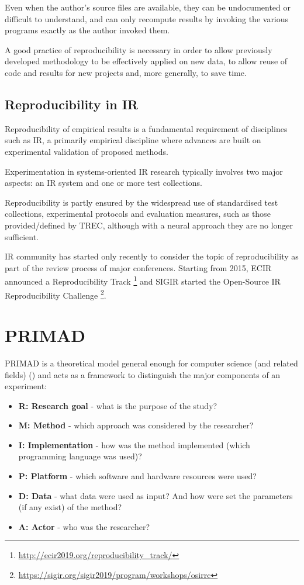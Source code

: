 Even when the author's source files are available, they can be undocumented or difficult to understand, and can only recompute results by invoking the various programs exactly as the author invoked them.

A good practice of reproducibility is necessary in order to allow previously developed methodology to be effectively applied on new data, to allow reuse of code and results for new projects and, more generally, to save time.

\subsection{Reproducibility in IR}

Reproducibility of empirical results is a fundamental requirement of disciplines such as IR, a primarily empirical discipline where advances are built on experimental validation of proposed methods.

Experimentation in systems-oriented IR research typically involves two major aspects: an IR system and one or more test collections.

Reproducibility is partly ensured by the widespread use of standardised test collections, experimental protocols and evaluation measures, such as those provided/defined by TREC, although with a neural approach they are no longer sufficient.

IR community has started only recently to consider the topic of reproducibility as part of the review process of major conferences. Starting from 2015, ECIR announced a Reproducibility Track \footnote{\url{http://ecir2019.org/reproducibility_track/}} and SIGIR started the Open-Source IR Reproducibility Challenge \footnote{\url{https://sigir.org/sigir2019/program/workshops/osirrc}}.

\section{PRIMAD}

PRIMAD is a theoretical model general enough for computer science (and related fields) (\cite{primad}) and acts as a framework to distinguish the major components of an experiment:

\begin{itemize}
\item \textbf{R: Research goal} - what is the purpose of the study?
\item \textbf{M: Method} - which approach was considered by the researcher?
\item \textbf{I: Implementation} - how was the method implemented (which programming language was used)?
\item \textbf{P: Platform} - which software and hardware resources were used? 
\item \textbf{D: Data} - what data were used as input? And how were set the parameters (if any exist) of the method?
\item \textbf{A: Actor} - who was the researcher?
\end{itemize}

